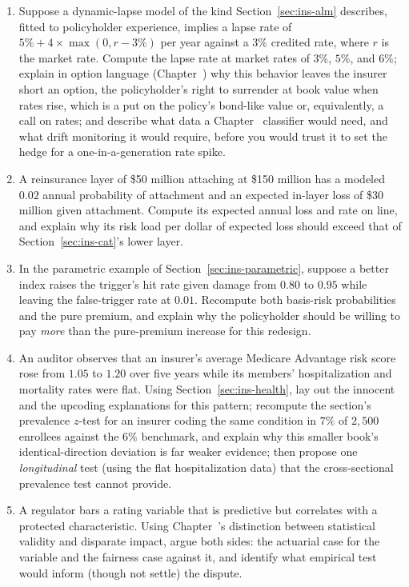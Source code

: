 \documentclass[../ai_in_finance]{subfiles}
\begin{document}
\begin{enumerate}[exercises]
\item Suppose a dynamic-lapse model of the kind Section~\ref{sec:ins-alm} describes, fitted to policyholder experience, implies a lapse rate of $5\% + 4 \times \max(0, r - 3\%)$ per year against a $3\%$ credited rate, where $r$ is the market rate. Compute the lapse rate at market rates of $3\%$, $5\%$, and $6\%$; explain in option language (Chapter~) why this behavior leaves the insurer short an option, the policyholder's right to surrender at book value when rates rise, which is a put on the policy's bond-like value or, equivalently, a call on rates; and describe what data a Chapter~ classifier would need, and what drift monitoring it would require, before you would trust it to set the hedge for a one-in-a-generation rate spike.
\item A reinsurance layer of \$50 million attaching at \$150 million has a modeled $0.02$ annual probability of attachment and an expected in-layer loss of \$30 million given attachment. Compute its expected annual loss and rate on line, and explain why its risk load per dollar of expected loss should exceed that of Section~\ref{sec:ins-cat}'s lower layer.
\item In the parametric example of Section~\ref{sec:ins-parametric}, suppose a better index raises the trigger's hit rate given damage from $0.80$ to $0.95$ while leaving the false-trigger rate at $0.01$. Recompute both basis-risk probabilities and the pure premium, and explain why the policyholder should be willing to pay \emph{more} than the pure-premium increase for this redesign.
\item An auditor observes that an insurer's average Medicare Advantage risk score rose from $1.05$ to $1.20$ over five years while its members' hospitalization and mortality rates were flat. Using Section~\ref{sec:ins-health}, lay out the innocent and the upcoding explanations for this pattern; recompute the section's prevalence $z$-test for an insurer coding the same condition in $7\%$ of $2{,}500$ enrollees against the $6\%$ benchmark, and explain why this smaller book's identical-direction deviation is far weaker evidence; then propose one \emph{longitudinal} test (using the flat hospitalization data) that the cross-sectional prevalence test cannot provide.
\item A regulator bars a rating variable that is predictive but correlates with a protected characteristic. Using Chapter~'s distinction between statistical validity and disparate impact, argue both sides: the actuarial case for the variable and the fairness case against it, and identify what empirical test would inform (though not settle) the dispute.

\end{enumerate}
\end{document}
